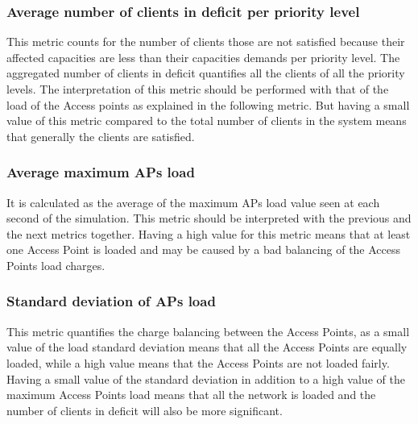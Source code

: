 \documentclass[journal,transmag]{IEEEtran}
\begin{document}
\subsubsection{Average number of clients in deficit per priority level}
This metric counts for the number of clients those are not satisfied because their affected capacities are less than their capacities demands per priority level. The aggregated number of clients in deficit quantifies all the clients of all the priority levels. The interpretation of this metric should be performed with that of the load of the Access points as explained in the following metric. But having a small value of this metric compared to the total number of clients in the system means that generally the clients are satisfied.  

\subsubsection{Average maximum APs load}
It is calculated as the average of the maximum APs load value seen at each second of the simulation. 
This metric should be interpreted with the previous and the next metrics together. Having a high value for this metric means that at least one Access Point is loaded and may be caused by a bad balancing of the Access Points load charges.

\subsubsection{Standard deviation of APs load}
This metric quantifies the charge balancing between the Access Points, as a small value of the load  standard deviation means that all the Access Points are equally loaded, while a high value means that the Access Points are not loaded fairly. Having a small value of the standard deviation in addition to a high value of the maximum Access Points load means that all the network is loaded and the number of clients in deficit will also be more significant.


\end{document}
